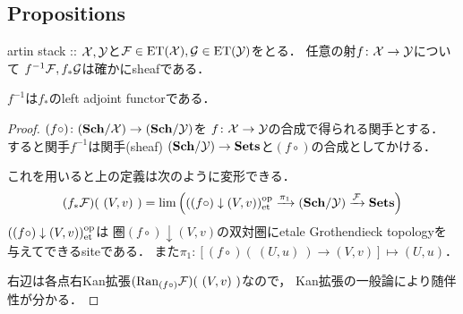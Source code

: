 \documentclass[a4paper, dvipdfmx]{jsarticle}
\newcommand{\xto}[1]{\xrightarrow{#1}}
\begin{document}
\subsection{Propositions}
\begin{Lemma}[\cite{SP} 06NW]
    artin stack :: $\mathcal{X}, \mathcal{Y}$と$\mathcal{F} \in \mathrm{ET}(\mathcal{X}), \mathcal{G} \in \mathrm{ET}(\mathcal{Y})$をとる．
    任意の射$f \colon \mathcal{X} \to \mathcal{Y}$について
    $f^{-1}\mathcal{F}, f_*\mathcal{G}$は確かにsheafである．
\end{Lemma}

\begin{Prop}[\cite{SP} 00XF]
    $f^{-1}$は$f_*$のleft adjoint functorである．
\end{Prop}
\begin{proof}
    $(f \circ) \colon (\mathbf{Sch}/\mathcal{X}) \to (\mathbf{Sch}/\mathcal{Y})$を
    $f \colon \mathcal{X} \to \mathcal{Y}$の合成で得られる関手とする．
    すると関手$f^{-1}$は関手(sheaf) $(\mathbf{Sch}/\mathcal{Y}) \to \mathbf{Sets}$と$(f \circ)$の合成としてかける．

    これを用いると上の定義は次のように変形できる．
    \[
        (f_*\shF)(\ (V,v)\ )
        =\Lim\Big(  ((f \circ) \downarrow (V,v))_{\et}^{\mathrm{op}} \xto{\pi_1} (\Sch/\stY) \xto{\shF} \Sets \Big)
    \]
    $((f \circ) \downarrow (V,v))_{\mathrm{et}}^{\mathrm{op}}$は
    圏$(f \circ) \downarrow (V,v)$の双対圏にetale Grothendieck topologyを与えてできるsiteである．
    また$\pi_1 \colon [(f \circ)(\ (U,u)\ ) \to (V,v)] \mapsto (U,u)$．
    
    右辺は各点右Kan拡張$(\mathrm{Ran}_{(f \circ)} \mathcal{F})(\ (V,v)\ )$なので，
    Kan拡張の一般論により随伴性が分かる．
\end{proof}
\end{document}
